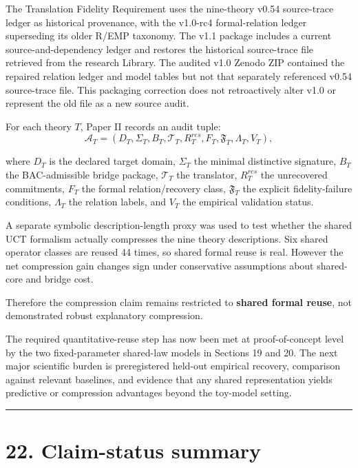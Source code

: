 \documentclass[
  11pt,
  a4paper,
]{article}
\begin{document}
The Translation Fidelity Requirement uses the nine-theory v0.54
source-trace ledger as historical provenance, with the v1.0-rc4
formal-relation ledger superseding its older R/EMP taxonomy. The v1.1
package includes a current source-and-dependency ledger and restores the
historical source-trace file retrieved from the research Library. The
audited v1.0 Zenodo ZIP contained the repaired relation ledger and model
tables but not that separately referenced v0.54 source-trace file. This
packaging correction does not retroactively alter v1.0 or represent the
old file as a new source audit.

For each theory \(T\), Paper II records an audit tuple:
\nopagebreak[4]
\[
\mathcal A_T
=
(D_T,\Sigma_T,B_T,\mathcal T_T,R_T^{res},F_T,\mathfrak F_T,\Lambda_T,V_T),
\]

where \(D_T\) is the declared target domain, \(\Sigma_T\) the minimal
distinctive signature, \(B_T\) the BAC-admissible bridge package,
\(\mathcal T_T\) the translator, \(R_T^{res}\) the unrecovered
commitments, \(F_T\) the formal relation/recovery class,
\(\mathfrak F_T\) the explicit fidelity-failure conditions,
\(\Lambda_T\) the relation labels, and \(V_T\) the empirical validation
status.

A separate symbolic description-length proxy was used to test whether
the shared UCT formalism actually compresses the nine theory
descriptions. Six shared operator classes are reused 44 times, so shared
formal reuse is real. However the net compression gain changes sign
under conservative assumptions about shared-core and bridge cost.

Therefore the compression claim remains restricted to \textbf{shared
formal reuse}, not demonstrated robust explanatory compression.

The required quantitative-reuse step has now been met at
proof-of-concept level by the two fixed-parameter shared-law models in
Sections 19 and 20. The next major scientific burden is preregistered
held-out empirical recovery, comparison against relevant baselines, and
evidence that any shared representation yields predictive or compression
advantages beyond the toy-model setting.

\begin{center}\rule{0.5\linewidth}{0.5pt}\end{center}

\hypertarget{claim-status-summary}{%
\section{22. Claim-status summary}\label{claim-status-summary}}
\end{document}
